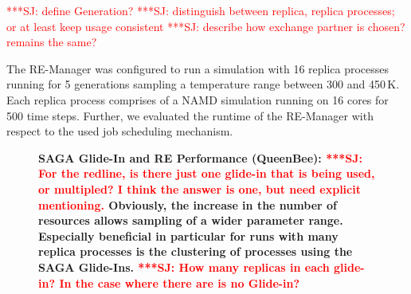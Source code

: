\documentclass{rspublic}
\newcommand{\jhanote}[1]{ {\textcolor{red} { ***SJ: #1 }}}
\newcommand{\jhanote}[1]{}
\begin{document}
{%

\jhanote{define Generation?}
\jhanote{distinguish  between replica, replica processes; or at least
 keep usage consistent}
\jhanote{describe how exchange partner is chosen? remains the same?}

The RE-Manager was configured to run a simulation with 16 replica processes 
running for 5 generations sampling a temperature range between 300 and 450\,K. 
Each replica process comprises of a NAMD simulation running on 16 cores 
for 500 time steps.   
Further, we evaluated the runtime of the RE-Manager with respect to the 
used job scheduling mechanism.

\begin{figure}[th]
    \centering      
        \caption{\footnotesize \bf SAGA Glide-In and RE Performance
          (QueenBee): \jhanote{For the redline, is there just one
            glide-in that is being used, or multipled? I think the
            answer is one, but need explicit mentioning.} Obviously,
          the increase in the number of resources allows sampling of a
          wider parameter range. Especially beneficial in particular
          for runs with many replica processes is the clustering of
          processes using the SAGA Glide-Ins. \jhanote{How many
            replicas in each glide-in? In the case where there are is
            no Glide-in?}}
    \label{fig:perf_remd_glidin}
\end{figure} 

}
\end{document}
